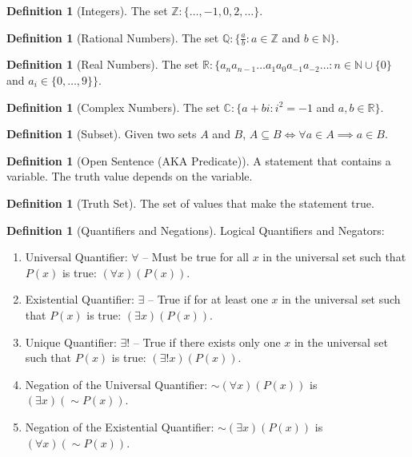 \documentclass[10pt]{article}
\theoremstyle{definition}
\newtheorem{definition}[equation]{Definition}
\newcommand{\N}{\mathbb{N}}
\newcommand{\Z}{\mathbb{Z}}
\newcommand{\R}{\mathbb{R}}
\begin{document}
\begin{definition}[Integers]
  The set $\Z: \{\dots, -1,0,2, \dots \}$.
\end{definition}

\begin{definition}[Rational Numbers]
  The set $\mathbb{Q}: \{\frac{a}{b}: a\in\Z$ and $b\in\N \}$.
\end{definition}


\begin{definition}[Real Numbers]
  The set $\R: \{a_n a_{n-1}\dots a_1a_0a_{-1}a_{-2} \dots:n\in\N\cup\{ 0\}$ and $a_i \in \{ 0,\dots,9\} \}$.
\end{definition}

\begin{definition}[Complex Numbers]
  The set $\mathbb{C}: \{a+bi:i^2 = -1$ and $a,b \in\R\}$.
\end{definition}

\begin{definition}[Subset]
  Given two sets $A$ and $B$, $A\subseteq B \iff \forall a\in A \implies a\in B$.
\end{definition}


\begin{definition}[Open Sentence (AKA Predicate)]
  A statement that contains a variable. The truth value depends on the variable.
\end{definition}

\begin{definition}[Truth Set]
  The set of values that make the statement true.
\end{definition}

\begin{definition}[Quantifiers and Negations]
  Logical Quantifiers and Negators:
  \begin{enumerate}
    \item Universal Quantifier: $\forall$ -- Must be true for all $x$ in the universal set such that  $P(x)$ is true: $(\forall x)(P(x))$.
    \item Existential Quantifier: $\exists$ -- True if for at least one $x$ in the universal set such that $P(x)$ is true: $(\exists x)(P(x))$.
    \item Unique Quantifier: $\exists!$ -- True if there exists only one $x$ in the universal set such that $P(x)$ is true: $(\exists! x)(P(x))$.
    \item Negation of the Universal Quantifier: $\sim(\forall x)(P(x))$ is $(\exists x)(\sim P(x))$.
    \item Negation of the Existential Quantifier: $\sim(\exists x)(P(x))$ is $(\forall x)(\sim P(x))$.
  \end{enumerate}
\end{definition}
\end{document}

